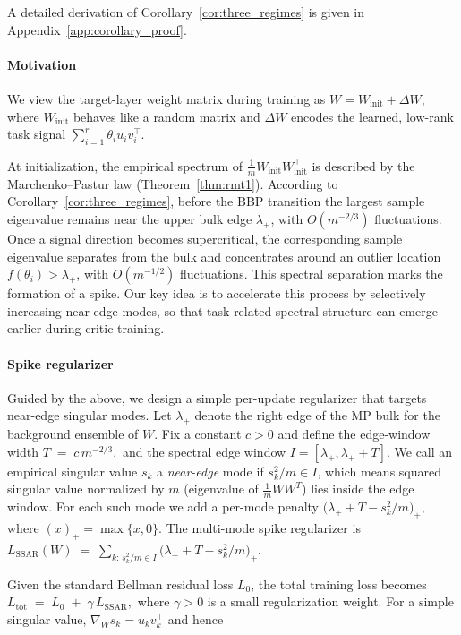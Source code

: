 A detailed derivation of Corollary~\ref{cor:three_regimes} is given in
Appendix~\ref{app:corollary_proof}.

\paragraph{Motivation}
We view the target-layer weight matrix during training as $W=W_{\mathrm{init}}+\Delta W$, where $W_{\mathrm{init}}$ behaves like a random matrix and $\Delta W$ encodes the learned, low-rank task signal $\sum_{i=1}^r \theta_i u_i v_i^\top$. 

At initialization, the empirical spectrum of
$\tfrac{1}{m}W_{\mathrm{init}}W_{\mathrm{init}}^\top$ is described by the
Marchenko--Pastur law (Theorem~\ref{thm:rmt1}). According to
Corollary~\ref{cor:three_regimes}, before the BBP transition the largest
sample eigenvalue remains near the upper bulk edge $\lambda_+$, with
$O(m^{-2/3})$ fluctuations. Once a signal direction becomes supercritical,
the corresponding sample eigenvalue separates from the bulk and concentrates
around an outlier location $f(\theta_i)>\lambda_+$, with
$O(m^{-1/2})$ fluctuations. This spectral separation marks the formation of
a spike. Our key idea is to accelerate this process by selectively increasing
near-edge modes, so that task-related spectral structure can emerge earlier
during critic training.
\paragraph{Spike regularizer}
Guided by the above, we design a simple per-update regularizer that targets near-edge singular modes. Let $\lambda_+$ denote the right edge of the MP bulk for the background ensemble of $W$. Fix a constant $c>0$ and define the edge-window width $T \;=\; c\, m^{-2/3},$ and the spectral edge window $I=[\lambda_+,\lambda_+ + T]$. We call an empirical singular value $s_k$ a \emph{near-edge} mode if $s_k^2/m \in I$, which means squared singular value normalized by $m$ (eigenvalue of $\frac{1}{m}WW^T$) lies inside the edge window. For each such mode we add a per-mode penalty $\big(\lambda_++T - s_k^2/m\big)_+,$ where $(x)_+=\max\{x,0\}$. The multi-mode spike regularizer is $L_{\mathrm{SSAR}}(W) \;=\; \sum_{k:\, s_k^2/m\in I} \big(\lambda_++T - s_k^2/m\big)_+.$

Given the standard Bellman residual loss $L_0$, the total training loss becomes $L_{\mathrm{tot}} \;=\; L_0 \;+\; \gamma\, L_{\mathrm{SSAR}},$ where $\gamma>0$ is a small regularization weight. For a simple singular value, $\nabla_Ws_k
=
u_kv_k^\top$ and hence


